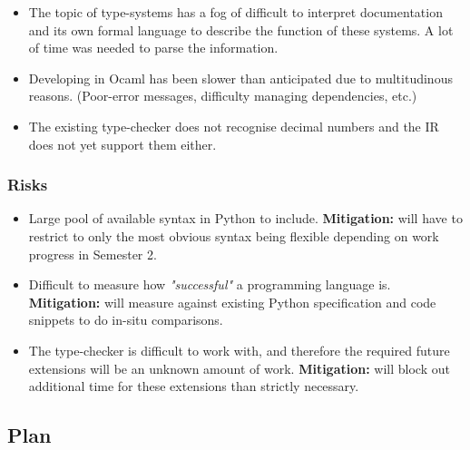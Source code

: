 \documentclass[11pt]{article}
\begin{document}
\begin{itemize}
    \item The topic of type-systems has a fog of difficult to interpret documentation and its own formal language to describe the function of these systems. A lot of time was needed to parse the information.
    \item Developing in Ocaml has been slower than anticipated due to multitudinous reasons. (Poor-error messages, difficulty managing dependencies, etc.)
    \item The existing type-checker does not recognise decimal numbers and the IR does not yet support them either.
\end{itemize}

\subsubsection{Risks}\label{risks}

\begin{itemize}
    \item Large pool of available syntax in Python to include. \textbf{Mitigation:} will have to restrict to only the most obvious syntax being flexible depending on work progress in Semester 2.
    \item Difficult to measure how \emph{"successful"} a programming language is. \textbf{Mitigation:} will measure against existing Python specification and code snippets to do in-situ comparisons.
    \item The type-checker is difficult to work with, and therefore the required future extensions will be an unknown amount of work. \textbf{Mitigation:} will block out additional time for these extensions than strictly necessary.
\end{itemize}

\subsection{Plan}\label{plan}
\end{document}
